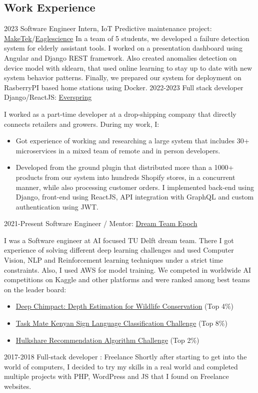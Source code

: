 \documentclass{article}
\begin{document}
\subsection{Work Experience}

\cvitem
{2023}
{Software Engineer Intern, IoT Predictive maintenance project:}
{ \href{https://www.maketek.nl/}{MakeTek}/\href{https://www.eaglescience.nl/}{Eaglescience}}
{In a team of 5 students, we developed a failure detection system for elderly assistant tools. I worked on a presentation dashboard using Angular and Django REST framework. Also created anomalies detection on device model with sklearn, that used online learning to stay up to date with new system behavior patterns. Finally, we prepared our system for deployment on RasberryPI based home stations using Docker.}
\cvitem
{2022-2023}
{Full stack developer Django/ReactJS:}
{ \href{https://everspring.app/nl/home}{Everspring}}
{I worked as a part-time developer at a drop-shipping company that directly connects retailers and growers. During my work, I:
\begin{itemize}
    \item Got experience of working and researching a large system that includes 30+
microservices in a mixed team of remote and in person developers.
    \item Developed from the ground plugin that distributed more than a 1000+ products from our system into hundreds Shopify stores, in a concurrent manner, while also processing customer orders. I implemented back-end using Django, front-end using ReactJS, API integration with GraphQL and custom authentication using JWT.
\end{itemize}}
\cvitem
{2021-Present}
{Software Engineer / Mentor:}
{ \href{https://www.teamepoch.net/}{Dream Team Epoch}}
{I was a Software engineer at AI focused TU Delft dream team. There I got experience of solving different deep learning challenges and used Computer Vision, NLP and Reinforcement learning techniques under a strict time constraints. Also, I used AWS for model training. We competed in worldwide AI competitions on Kaggle and other platforms and were ranked among best teams on the leader board:
\begin{itemize}
    \item \href{https://www.drivendata.org/competitions/82/competition-wildlife-video-depth-estimation/}{Deep Chimpact: Depth Estimation for Wildlife Conservation} (Top 4\%)
    \item \href{https://zindi.africa/competitions/kenyan-sign-language-classification-challenge}{Task Mate Kenyan Sign Language Classification Challenge} (Top 8\%)
    \item \href{https://zindi.africa/competitions/hulkshare-recommendation-algorithm-challenge}{Hulkshare Recommendation Algorithm Challenge} (Top 2\%)
\end{itemize}}
\cvitem
{2017-2018}
{Full-stack developer}
{: Freelance}
{Shortly after starting to get into the world of computers, I decided to try my skills in a real world and completed multiple projects with PHP, WordPress and JS that I found on Freelance websites.}
\end{document}
